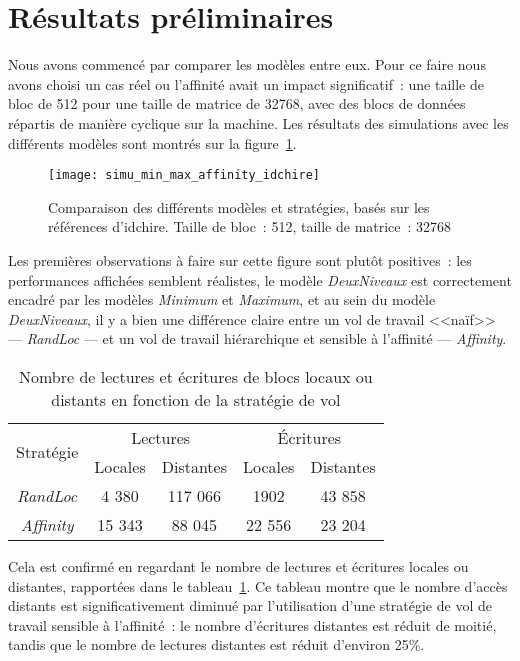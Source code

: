 \section{Résultats préliminaires}\label{sec:simulation:resultats}


Nous avons commencé par comparer les modèles entre eux.
Pour ce faire nous avons choisi un cas réel ou l'affinité avait un impact significatif~: une taille de bloc de 512 pour une taille de matrice de 32768, avec des blocs de données répartis de manière cyclique sur la machine.
Les résultats des simulations avec les différents modèles sont montrés sur la figure~\ref{fig:simu:modeles:idchire}.

\begin{figure}[h!]
  \centering
  \texttt{[image: simu\_min\_max\_affinity\_idchire]}
  \caption{Comparaison des différents modèles et stratégies, basés sur les références d'idchire. Taille de bloc~: 512, taille de matrice~: 32768}\label{fig:simu:modeles:idchire}
\end{figure}


Les premières observations à faire sur cette figure sont plutôt positives~: les performances affichées semblent réalistes, le modèle \emph{DeuxNiveaux} est correctement encadré par les modèles \emph{Minimum} et \emph{Maximum}, et au sein du modèle \emph{DeuxNiveaux}, il y a bien une différence claire entre un vol de travail <<naïf>> --- \emph{RandLoc} --- et un vol de travail hiérarchique et sensible à l'affinité --- \emph{Affinity}.

\begin{table}[h!]
\def\arraystretch{1.5}
\centering
\begin{tabular}{|c||c|c|c|c|}\hline
  \multirow{2}{*}{Stratégie} & \multicolumn{2}{c|}{Lectures} & \multicolumn{2}{c|}{Écritures} \\ \cline{2-5}
    & Locales & Distantes & Locales & Distantes \\
  \hline
  \emph{RandLoc} & 4 380 & 117 066 & 1902 & 43 858 \\
  \hline
  \emph{Affinity} & 15 343 & 88 045 & 22 556 & 23 204 \\
  \hline
\end{tabular}
\caption{Nombre de lectures et écritures de blocs locaux ou distants en fonction de la stratégie de vol}\label{tab:simu:acces-blocs-idchire}
\end{table}

Cela est confirmé en regardant le nombre de lectures et écritures locales ou distantes, rapportées dans le tableau~\ref{tab:simu:acces-blocs-idchire}.
Ce tableau montre que le nombre d'accès distants est significativement diminué par l'utilisation d'une stratégie de vol de travail sensible à l'affinité~: le nombre d'écritures distantes est réduit de moitié, tandis que le nombre de lectures distantes est réduit d'environ 25\%.


